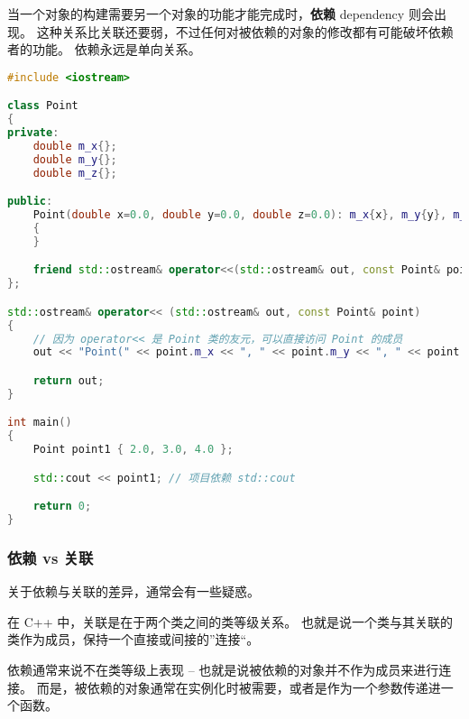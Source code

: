 \documentclass[../../LearnCpp.tex]{subfiles}
\begin{document}

当一个对象的构建需要另一个对象的功能才能完成时，\textbf{依赖} dependency 则会出现。
这种关系比关联还要弱，不过任何对被依赖的对象的修改都有可能破坏依赖者的功能。
依赖永远是单向关系。

\begin{lstlisting}[language=C++]
#include <iostream>

class Point
{
private:
    double m_x{};
    double m_y{};
    double m_z{};

public:
    Point(double x=0.0, double y=0.0, double z=0.0): m_x{x}, m_y{y}, m_z{z}
    {
    }

    friend std::ostream& operator<<(std::ostream& out, const Point& point); // Point 依赖于 std::ostream
};

std::ostream& operator<< (std::ostream& out, const Point& point)
{
    // 因为 operator<< 是 Point 类的友元，可以直接访问 Point 的成员
    out << "Point(" << point.m_x << ", " << point.m_y << ", " << point.m_z << ')';

    return out;
}

int main()
{
    Point point1 { 2.0, 3.0, 4.0 };

    std::cout << point1; // 项目依赖 std::cout

    return 0;
}
\end{lstlisting}

\subsubsection*{依赖 vs 关联}

关于依赖与关联的差异，通常会有一些疑惑。

在 C++ 中，关联是在于两个类之间的类等级关系。
也就是说一个类与其关联的类作为成员，保持一个直接或间接的”连接“。

依赖通常来说不在类等级上表现 -- 也就是说被依赖的对象并不作为成员来进行连接。
而是，被依赖的对象通常在实例化时被需要，或者是作为一个参数传递进一个函数。
\end{document}
